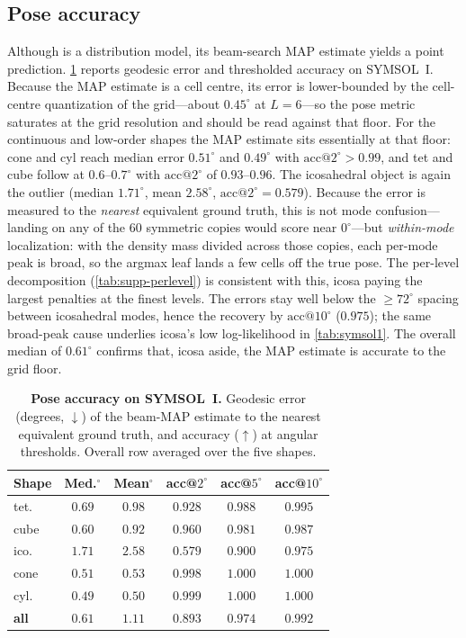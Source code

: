 \subsection{Pose accuracy}
\label{sec:pose}
\label{sec:poseacc}

Although \method{} is a distribution model, its beam-search MAP estimate yields a
point prediction. \cref{tab:pose} reports geodesic error and thresholded accuracy
on SYMSOL~I. Because the MAP estimate is a cell centre, its error is lower-bounded
by the cell-centre quantization of the grid---about $0.45^\circ$ at $L{=}6$---so
the pose metric saturates at the grid resolution and should be read against that
floor. For the continuous and low-order shapes the MAP estimate sits essentially
at that floor: cone and cyl reach median error $0.51^\circ$ and $0.49^\circ$ with
$\text{acc@}2^\circ>0.99$, and tet and cube follow at $0.6$--$0.7^\circ$ with
$\text{acc@}2^\circ$ of $0.93$--$0.96$. The icosahedral object is again the
outlier (median $1.71^\circ$, mean $2.58^\circ$, $\text{acc@}2^\circ=0.579$).
Because the error is measured to the \emph{nearest} equivalent ground truth, this
is not mode confusion---landing on any of the $60$ symmetric copies would score
near $0^\circ$---but \emph{within-mode} localization: with the density mass
divided across those copies, each per-mode peak is broad, so the argmax leaf lands
a few cells off the true pose. The per-level decomposition
(\cref{tab:supp-perlevel}) is consistent with this, icosa paying the largest
penalties at the finest levels. The errors stay well below the $\ge\!72^\circ$
spacing between icosahedral modes, hence the recovery by $\text{acc@}10^\circ$
($0.975$); the same broad-peak cause underlies icosa's low log-likelihood in
\cref{tab:symsol1}. The overall median of $0.61^\circ$ confirms that, icosa aside,
the MAP estimate is accurate to the grid floor.

\begin{table}[t]
\centering
\caption{\textbf{Pose accuracy on SYMSOL~I.} Geodesic error (degrees, $\downarrow$)
of the beam-MAP estimate to the nearest equivalent ground truth, and accuracy
($\uparrow$) at angular thresholds. Overall row averaged over the five shapes.}
\label{tab:pose}
\small
\setlength{\tabcolsep}{4pt}
\begin{tabular}{l cc ccc}
\toprule
Shape & Med.$^\circ$ & Mean$^\circ$ & acc@$2^\circ$ & acc@$5^\circ$ & acc@$10^\circ$ \\
\midrule
tet.  & $0.69$ & $0.98$ & $0.928$ & $0.988$ & $0.995$ \\
cube  & $0.60$ & $0.92$ & $0.960$ & $0.981$ & $0.987$ \\
ico.  & $1.71$ & $2.58$ & $0.579$ & $0.900$ & $0.975$ \\
cone  & $0.51$ & $0.53$ & $0.998$ & $1.000$ & $1.000$ \\
cyl.  & $0.49$ & $0.50$ & $0.999$ & $1.000$ & $1.000$ \\
\midrule
\textbf{all} & $0.61$ & $1.11$ & $0.893$ & $0.974$ & $0.992$ \\
\bottomrule
\end{tabular}
\end{table}

